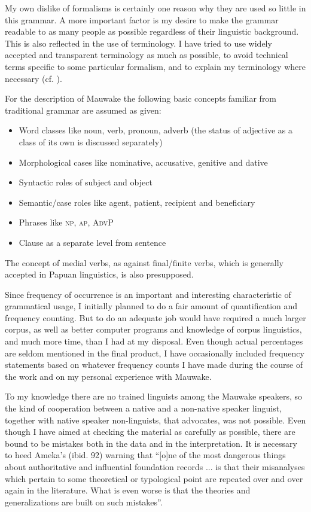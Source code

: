 My own dislike of formalisms is certainly one reason why they are used so little in this grammar.  A more important factor is my desire to make the grammar readable to as many people as possible regardless of their linguistic background. This is also reflected in the use of terminology. I have tried to use widely accepted and transparent terminology as much as possible, to avoid technical terms specific to some particular formalism, and to explain my terminology where necessary (cf. \citealt{Cristofaro2006}). 

For the description of Mauwake the following basic concepts familiar from traditional grammar are assumed as given:

\begin{itemize}
\item Word classes like noun, verb, pronoun, adverb (the status of adjective as a class of its own is discussed separately)
\item Morphological cases like nominative, accusative, genitive and dative
\item Syntactic roles of subject and object
\item Semantic/case roles like agent, patient, recipient and beneficiary
\item Phrases like \textsc{np}, \textsc{ap}, \textsc{AdvP}
\item Clause as a separate level from sentence
\end{itemize}


The concept of medial verbs, as against final/finite verbs, which is generally accepted in Papuan linguistics, is also presupposed. 

Since frequency of occurrence is an important and interesting characteristic of grammatical usage, I initially planned to do a fair amount of quantification and frequency counting.  But to do an adequate job would have required a much larger corpus, as well as better computer programs and knowledge of corpus linguistics, and much more time, than I had at my disposal. Even though actual percentages are seldom mentioned in the final product, I have occasionally included frequency statements based on whatever frequency counts I have made during the course of the work and on my personal experience with Mauwake. 

To my knowledge there are no trained linguists among the Mauwake speakers, so the kind of cooperation between a native and a non-native speaker linguist, together with native speaker non-linguists, that \citet{Ameka2006} advocates, was not possible.  Even though I have aimed at checking the material as carefully as possible, there are bound to be mistakes both in the data and in the interpretation. It is necessary to heed Ameka's (ibid. 92) warning that ``[o]ne of the most dangerous things about authoritative and influential foundation records ... is that their misanalyses which pertain to some theoretical or typological point are repeated over and over again in the literature.  What is even worse is that the theories and generalizations are built on such mistakes''. 

